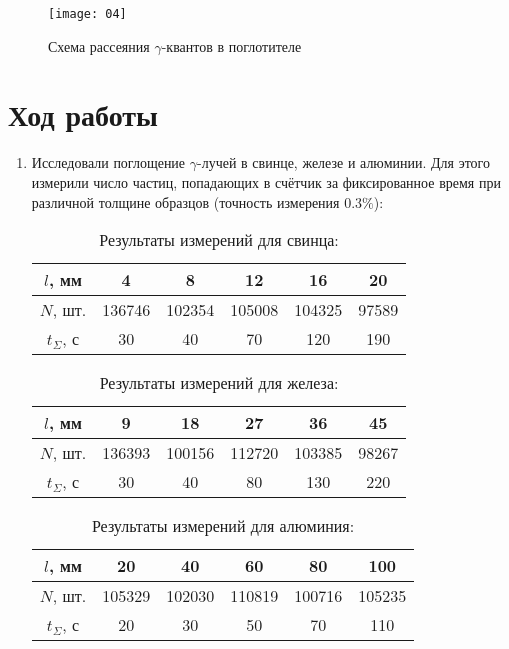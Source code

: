 \documentclass{physlab}
\begin{document}
\begin{figure} [h!]
	\centering
	\texttt{[image: 04]}
	\caption{Схема рассеяния $\gamma$-квантов в поглотителе}
\end{figure}
			
	

\section{Ход работы}
	
\begin{enumerate}
	\item Исследовали поглощение $\gamma$-лучей в свинце, железе и алюминии. Для этого измерили число частиц, попадающих в счётчик за фиксированное время  при различной толщине образцов (точность измерения $0.3\%$):  
		
	\begin{table}[H]
	\centering
		\caption{Результаты измерений для свинца:}
		\begin{tabular}{|c||c|c|c|c|c|}
			\hline
			$l$, мм & 4 & 8 & 12 & 16 & 20 \\ \hline
			$N$, шт. & 136746 & 102354 & 105008 & 104325 & 97589  \\ \hline
			$t_\Sigma$, с & 30 & 40 & 70 & 120 & 190 \\ \hline
		\end{tabular}
	\end{table}
		
	\begin{table}[H]
	\centering
		\caption{Результаты измерений для железа:}
		\begin{tabular}{|c||c|c|c|c|c|}
			\hline
			$l$, мм & 9 & 18 & 27 & 36 & 45 \\ \hline
			$N$, шт. & 136393 & 100156 & 112720 & 103385 & 98267 \\ \hline
			$t_\Sigma$, с & 30 & 40 & 80 & 130 & 220 \\ \hline
		\end{tabular}
	\end{table}
		
	\begin{table}[H]
    \centering
	   \caption{Результаты измерений для алюминия:}
	   \begin{tabular}{|c||c|c|c|c|c|}
			\hline
			$l$, мм & 20 & 40 & 60 & 80 & 100 \\ \hline
			$N$, шт. & 105329 & 102030 & 110819 & 100716 & 105235 \\ \hline
			$t_\Sigma$, с & 20 & 30 & 50 & 70 & 110 \\ \hline
		\end{tabular}
	\end{table}
		

\end{enumerate}
\end{document}
